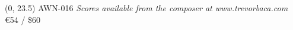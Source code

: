 \documentclass[10pt]{article}
\begin{document}
\begin{textblock}{23}(0, 23.5)
AWN-016 \hfill
\textit{Scores available from the composer at www.trevorbaca.com} \hfill
\euro 54 / \$60
\end{textblock}
\end{document}
